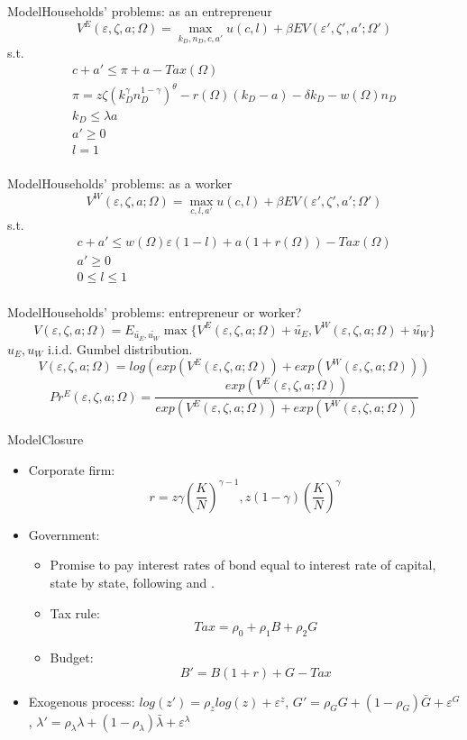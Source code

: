 \documentclass[svgnames]{beamer}
\begin{document}
\begin{frame}{Model}{Households' problems: as an entrepreneur}
$$
V^E(\varepsilon,\zeta,a;\Omega) = \max_{k_D,n_D,c,a'}
u(c,l)
+ \beta E V(\varepsilon',\zeta',a';\Omega')
$$
s.t.
$$
\begin{aligned}
c + a' \leq \pi + a - Tax(\Omega) \\
\pi = z \zeta (k_D^{\gamma} n_D^{1-\gamma})^{\theta}
 - r(\Omega)(k_D-a) - \delta k_D - w(\Omega)n_D \\
k_D \leq \lambda a \\
a'\geq 0 \\
l=1\\
\end{aligned}
$$
\end{frame}

\begin{frame}{Model}{Households' problems: as a worker}
$$
V^W(\varepsilon,\zeta,a;\Omega) = \max_{c,l,a'} u(c,l) + \beta E V(\varepsilon',\zeta',a';\Omega')
$$
s.t.
$$
\begin{aligned}
c+a' \leq w(\Omega) \varepsilon(1-l) + a(1+r(\Omega)) - Tax(\Omega) \\
a' \geq 0 \\
0\leq l \leq 1\\
\end{aligned}
$$
\end{frame}

\begin{frame}{Model}{Households' problems: entrepreneur or worker?}
$$
V(\varepsilon,\zeta,a;\Omega) = E_{\tilde{u_E},\tilde{u_W}} \max \{V^E(\varepsilon,\zeta,a;\Omega)+\tilde{u_E},V^W(\varepsilon,\zeta,a;\Omega)+\tilde{u_W}\}
$$
$u_E,u_W$ i.i.d. Gumbel distribution.
$$
V(\varepsilon,\zeta,a;\Omega) = log(exp(V^E(\varepsilon,\zeta,a;\Omega))+exp(V^W(\varepsilon,\zeta,a;\Omega)))
$$
$$
Pr^E(\varepsilon,\zeta,a;\Omega) = \frac{exp(V^E(\varepsilon,\zeta,a;\Omega))}
{exp(V^E(\varepsilon,\zeta,a;\Omega))+exp(V^W(\varepsilon,\zeta,a;\Omega))}
$$
\end{frame}

\begin{frame}{Model}{Closure}
\begin{itemize}
\item Corporate firm:
$$r = z \gamma (\frac{K}{N})^{\gamma-1}, z(1-\gamma) (\frac{K}{N})^{\gamma}$$
\item Government:
\begin{itemize}
\item Promise to pay interest rates of bond equal to interest rate of capital, state by state, following \citet{heathcote_fiscal_2005} and \citet{bachmann_welfare_2013}.
\item Tax rule:
$$
Tax = \rho_0 + \rho_1 B + \rho_2 G
$$
\item Budget:
$$
B'= B(1+r) + G - Tax
$$
\end{itemize}
\item Exogenous process:
$log(z') = \rho_z log(z) + \varepsilon^z$,
$G' = \rho_G G + (1-\rho_G)\bar{G} + \varepsilon^G$,
$\lambda' = \rho_{\lambda} \lambda + (1-\rho_{\lambda})\bar{\lambda}
+\varepsilon^{\lambda}$
\end{itemize}
\end{frame}
\end{document}
